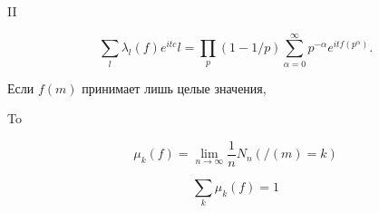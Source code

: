 \documentclass[10pt]{article}
\begin{document}
II



\[

\sum_{l} \lambda_{l}(f) e^{i t c} l=\prod_{p}(1-1 / p) \sum_{\alpha=0}^{\infty} p^{-\alpha} e^{i t f\left(p^{\alpha}\right)} .

\]



Если $f(m)$ принимает лишь целые значения,



To



\[

\mu_{k}(f)=\lim _{n \rightarrow \infty} \frac{1}{n} N_{n}(/(m)=k)

\]



\[

\sum_{k} \mu_{k}(f)=1

\]
\end{document}
